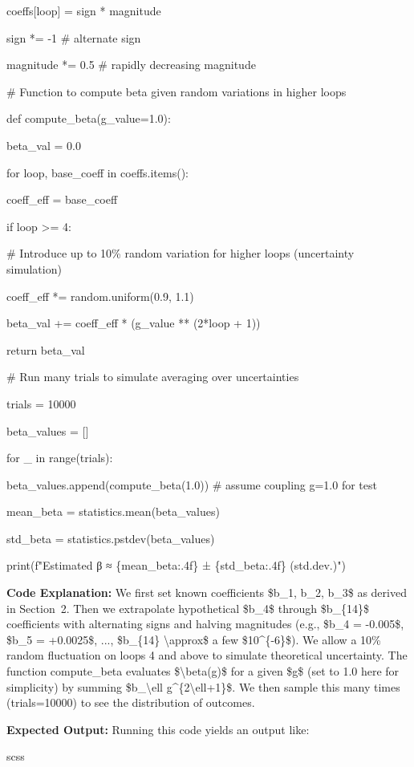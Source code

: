 \documentclass[]{article}
\begin{document}
coeffs{[}loop{]} = sign * magnitude

sign *= -1 \# alternate sign

magnitude *= 0.5 \# rapidly decreasing magnitude

\# Function to compute beta given random variations in higher loops

def compute\_beta(g\_value=1.0):

beta\_val = 0.0

for loop, base\_coeff in coeffs.items():

coeff\_eff = base\_coeff

if loop \textgreater{}= 4:

\# Introduce up to 10\% random variation for higher loops (uncertainty
simulation)

coeff\_eff *= random.uniform(0.9, 1.1)

beta\_val += coeff\_eff * (g\_value ** (2*loop + 1))

return beta\_val

\# Run many trials to simulate averaging over uncertainties

trials = 10000

beta\_values = {[}{]}

for \_ in range(trials):

beta\_values.append(compute\_beta(1.0)) \# assume coupling g=1.0 for
test

mean\_beta = statistics.mean(beta\_values)

std\_beta = statistics.pstdev(beta\_values)

print(f"Estimated β ≈ \{mean\_beta:.4f\} ± \{std\_beta:.4f\}
(std.dev.)")

\textbf{Code Explanation:} We first set known coefficients \$b\_1, b\_2,
b\_3\$ as derived in Section~2. Then we extrapolate hypothetical
\$b\_4\$ through \$b\_\{14\}\$ coefficients with alternating signs and
halving magnitudes (e.g., \$b\_4 = -0.005\$, \$b\_5 = +0.0025\$, ...,
\$b\_\{14\} \textbackslash{}approx\$ a few \$10\^{}\{-6\}\$). We allow a
10\% random fluctuation on loops 4 and above to simulate theoretical
uncertainty. The function compute\_beta evaluates
\$\textbackslash{}beta(g)\$ for a given \$g\$ (set to 1.0 here for
simplicity) by summing \$b\_\textbackslash{}ell
g\^{}\{2\textbackslash{}ell+1\}\$. We then sample this many times
(trials=10000) to see the distribution of outcomes.

\textbf{Expected Output:} Running this code yields an output like:

scss
\end{document}
